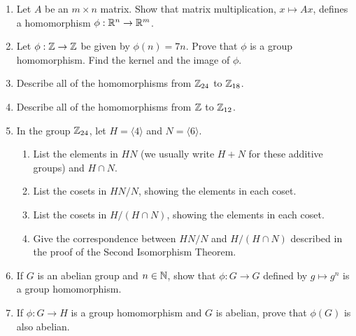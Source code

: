 {\begin{enumerate}
\begin{enumerate}
\end{enumerate}
 
  
 
\bf\item\rm
Let $A$ be an $m \times n$ matrix.  Show that matrix multiplication,
$x \mapsto Ax$, defines a homomorphism $\phi : {\Bbb R}^n \rightarrow
{\Bbb R}^m$. 
 
 
\bf\item\rm
Let $\phi : {\Bbb Z} \rightarrow {\Bbb Z}$ be given by $\phi(n) = 7n$.
Prove that $\phi$ is a group homomorphism. Find the kernel and the
image of $\phi$.
 
 
\bf\item\rm
Describe all of the homomorphisms from ${\Bbb Z}_{24}$ to ${\Bbb
Z}_{18}$. 
 
 
\bf\item\rm
Describe all of the homomorphisms from ${\Bbb Z}$ to ${\Bbb Z}_{12}$. 
 
 
\bf\item\rm
In the group ${\Bbb Z}_{24}$, let $H = \langle 4 \rangle$ and $N =
\langle 6 \rangle$. 
\begin{enumerate}
 
 \bf\item\rm
List the elements in $HN$ (we usually write $H + N$ for these additive
groups) and $H \cap N$. 
 
 \bf\item\rm
List the cosets in $HN/N$, showing the elements in each coset.
 
 \bf\item\rm
List the cosets in $H/(H \cap N)$, showing the elements in each coset. 
 
 \bf\item\rm
Give the correspondence between $HN/N$ and $H/(H \cap N)$ described in
the proof of the Second Isomorphism Theorem. 
 
\end{enumerate}
 
 
 
 
\bf\item\rm
If $G$ is an abelian group and $n \in {\Bbb N}$, show that $\phi : G
\rightarrow G$  defined by $g \mapsto g^n$ is a group homomorphism. 
 
 

 
\bf\item\rm
If $\phi : G \rightarrow H$ is a group homomorphism and $G$ is
abelian, prove that $\phi(G)$ is also abelian. 
 

\end{enumerate}}
